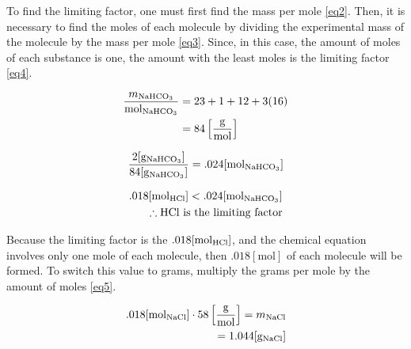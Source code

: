 \documentclass{article}
\begin{document}
    \begin{justify}

      To find the limiting factor, one must first find the mass per mole \eqref{eq2}. Then, it is necessary to find the moles of each molecule by dividing the experimental mass of the molecule by the mass per mole \eqref{eq3}. Since, in this case, the amount of moles of each substance is one, the amount with the least moles is the limiting factor \eqref{eq4}.

    \end{justify}

\begin{equation} \label{eq2}
\begin{split}
  \frac{m_{\ce{NaHCO3}}}{\si{\mole}_{\ce{NaHCO3}}} & = 23 + 1 + 12 + 3(16)  \\
  & = 84\left[ \frac{\si{\gram}}{\si{\mole}}  \right] \\
\end{split}
\end{equation}

\begin{equation} \label{eq3}
\frac{2[\si{\gram}_{\ce{NaHCO3}}]}{84[\si{\gram}_{\ce{NaHCO3}}]} = .024[\si{\mole}_{\ce{NaHCO3}}]
\end{equation}

\begin{equation} \label{eq4}
  \begin{split}
  .018[\si{\mole}_{\ce{HCl}}] < .024[\si{\mole}_{\ce{NaHCO3}}] \\
    \therefore \text{\ce{HCl} is the limiting factor}
  \end{split}
\end{equation}

\begin{justify}

  Because the limiting factor is the $.018[\si{\mole}_{\ce{HCl}}]$, and the chemical equation involves only one mole of each molecule, then $.018[\si{\mole}]$ of each molecule will be formed. To switch this value to grams, multiply the grams per mole by the amount of moles \eqref{eq5}.

\end{justify}

\begin{equation} \label{eq5}
  \begin{split}
    .018[\si{\mole}_{\ce{NaCl}}]\cdot 58\left[ \frac{\si{\gram}}{\si{\mole}} \right] = m_{\ce{NaCl}}\\
    = 1.044[\si{\gram}_{\ce{NaCl}}]
  \end{split}
\end{equation}
\end{document}
